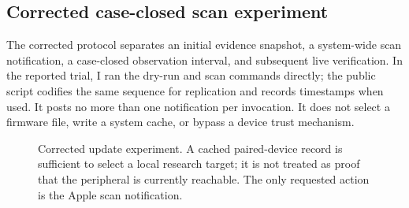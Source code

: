 \documentclass[11pt,letterpaper]{article}
\begin{document}
\subsection{Corrected case-closed scan experiment}
The corrected protocol separates an initial evidence snapshot, a system-wide scan notification, a case-closed observation interval, and subsequent live verification. In the reported trial, I ran the dry-run and scan commands directly; the public script codifies the same sequence for replication and records timestamps when used. It posts no more than one notification per invocation. It does not select a firmware file, write a system cache, or bypass a device trust mechanism.

\begin{figure}[htbp]\centering
{}
\caption{Corrected update experiment. A cached paired-device record is sufficient to select a local research target; it is not treated as proof that the peripheral is currently reachable. The only requested action is the Apple scan notification.}\label{fig:protocol}
\end{figure}
\end{document}
